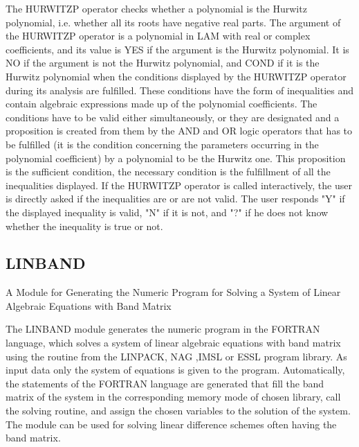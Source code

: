      The HURWITZP operator checks  whether a  polynomial is  the Hurwitz
polynomial, i.e.  whether all  its roots  have negative  real parts. The
argument of the HURWITZP operator is  a polynomial  in LAM  with real or
complex  coefficients,  and  its  value  is  YES  if the argument is the
Hurwitz polynomial.  It  is  NO  if  the  argument  is  not  the Hurwitz
polynomial, and COND if it is the Hurwitz polynomial when the conditions
displayed by the HURWITZP  operator during  its analysis  are fulfilled.
These  conditions  have  the  form of inequalities and contain algebraic
expressions made up of the polynomial coefficients. The  conditions have
to  be  valid  either  simultaneously,  or  they  are  designated  and a
proposition is created from them by the AND and OR  logic operators that
has  to  be  fulfilled  (it  is  the condition concerning the parameters
occurring in the polynomial  coefficient)  by  a  polynomial  to  be the
Hurwitz one. This proposition is the sufficient condition, the necessary
condition is the fulfillment of all the inequalities displayed.
     If the HURWITZP  operator  is  called  interactively,  the  user is
directly  asked  if  the  inequalities  are  or  are not valid. The user
responds "Y" if the displayed inequality is valid, "N" if it is not, and
"?" if he does not know whether the inequality is true or not.



\subsection{LINBAND}




            A Module for Generating the Numeric Program for
            Solving a System of Linear Algebraic Equations
                           with Band Matrix



     The LINBAND  module generates  the numeric  program in  the FORTRAN
language, which solves a system of linear algebraic equations with  band
matrix using  the routine  from the  LINPACK, NAG  ,IMSL or ESSL program
library.  As  input data only  the system of  equations is given  to the
program.   Automatically,  the  statements  of  the FORTRAN language are
generated that fill the band  matrix of the system in  the corresponding
memory mode of chosen library, call the solving routine, and assign  the
chosen variables to the solution of  the system. The module can be  used
for solving linear difference schemes often having the band matrix.


